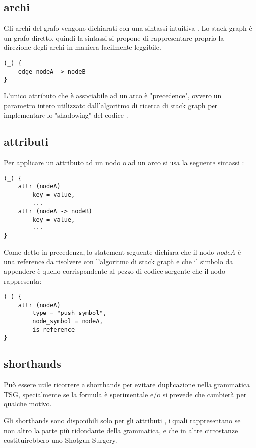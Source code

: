\subsection{archi}

Gli archi del grafo vengono dichiarati con una sintassi intuitiva \cite{TreeSitterGraphReferenceEdges}.
Lo stack graph \`e un grafo diretto, quindi la sintassi si propone di rappresentare proprio la direzione degli archi in maniera facilmente leggibile.

\begin{lstlisting}
(_) {
    edge nodeA -> nodeB
}
\end{lstlisting}

L'unico attributo che \`e associabile ad un arco \`e "precedence", ovvero un parametro intero utilizzato dall'algoritmo di ricerca di stack graph per implementare lo "shadowing" del codice \cite{TreeSitterStackGraphEdges}.

\subsection{attributi}

Per applicare un attributo ad un nodo o ad un arco si usa la seguente sintassi \cite{TreeSitterGraphReferenceAttributes}:

\begin{lstlisting}
(_) {
    attr (nodeA)
        key = value,
        ...
    attr (nodeA -> nodeB)
        key = value,
        ...
}
\end{lstlisting}

Come detto in precedenza, lo statement seguente dichiara che il nodo \emph{nodeA} \`e una reference da risolvere con l'algoritmo di stack graph e che il simbolo da appendere \`e quello corrispondente al pezzo di codice sorgente che il nodo rappresenta:

\begin{lstlisting}
(_) {
    attr (nodeA)
        type = "push_symbol",
        node_symbol = nodeA,
        is_reference
}
\end{lstlisting}

\subsection{shorthands}
Pu\`o essere utile ricorrere a shorthands per evitare duplicazione nella grammatica TSG, specialmente se la formula \`e sperimentale e/o si prevede che cambier\`a per qualche motivo.

Gli shorthands sono disponibili solo per gli attributi \cite{TreeSitterGraphReferenceAttributeShorthands}, i quali rappresentano se non altro la parte pi\`u ridondante della grammatica, e che in altre circostanze costituirebbero uno Shotgun Surgery.

